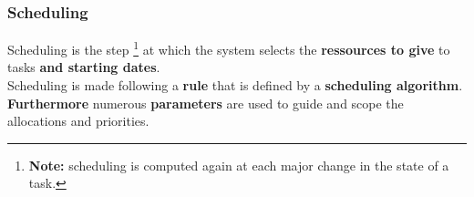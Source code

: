 \documentclass{beamer}
\begin{document}
\begin{frame}
	\frametitle{Scheduling}
	
	Scheduling is the step \footnote{{\bf Note:} scheduling is computed again at each major change in the state of a task.}
at which the system selects the {\bf ressources to give} to tasks {\bf and starting dates}.
\\[0.4cm]
	Scheduling is made following a {\bf rule} that is defined by a {\bf scheduling algorithm}.
\\[0.4cm]
	{\bf Furthermore} numerous {\bf parameters} are used to guide and scope the allocations and priorities.
 

\end{frame}


\end{document}
